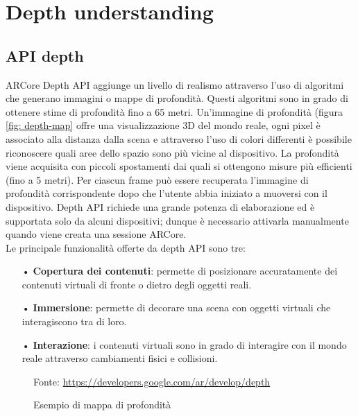 \documentclass[crop=false, class=book]{standalone}
\begin{document}
		
	\chapter{Depth understanding}
	
		\section{API depth}
	
			ARCore Depth API aggiunge un livello di realismo attraverso l'uso di algoritmi che generano immagini o mappe di 				profondità. Questi algoritmi sono in grado di ottenere stime di profondità fino a 65 metri. Un'immagine di 						profondità 	(figura \vref{fig: depth-map} offre una visualizzazione 3D del mondo reale, ogni pixel è 							associato alla distanza dalla scena e attraverso l'uso di colori differenti è possibile riconoscere quali aree 					dello spazio sono più vicine al dispositivo. La profondità viene acquisita con piccoli spostamenti dai quali si 				ottengono misure più efficienti (fino a 5 metri). Per ciascun frame può essere recuperata 										l'immagine di profondità corrispondente dopo che l'utente abbia iniziato a muoversi con il dispositivo. Depth API 				richiede una grande potenza di elaborazione ed è supportata solo da alcuni dispositivi; dunque è necessario 					attivarla manualmente quando viene creata una sessione ARCore.\\
		 	Le principale funzionalità offerte da depth API sono tre:
		\begin{itemize}
			\item[•] \textbf{Copertura dei contenuti}: permette di posizionare accuratamente dei contenuti virtuali di fronte o dietro degli oggetti reali.
			\item[•] \textbf{Immersione}: permette di decorare una scena con oggetti virtuali che interagiscono tra di loro.
			\item[•] \textbf{Interazione}: i contenuti virtuali sono in grado di interagire con il mondo reale attraverso cambiamenti fisici e collisioni.
		\end{itemize}
		
			\begin{figure}
				\centering
				{Fonte: \url{https://developers.google.com/ar/develop/depth}}
				\caption{Esempio di mappa di profondità}
				\label{fig: depth-map}
			\end{figure}	
		
\end{document}
